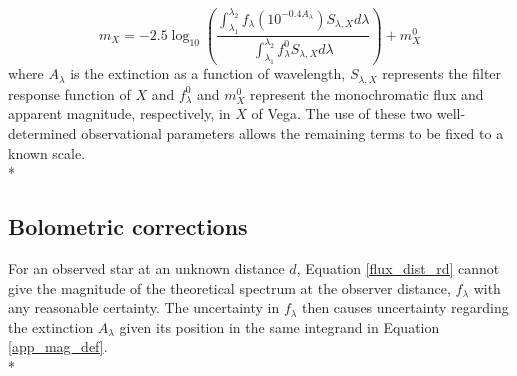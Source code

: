 \documentclass[12pt, a4paper]{report}
\begin{document}
\begin{equation}
m_{X} = -2.5 \log_{10} \left(\frac{ \int_{\lambda_{1}}^{\lambda_{2}} f_{\lambda} \left( 10^{-0.4 A_{\lambda}} \right) S_{\lambda,X} d\lambda }{ \int_{\lambda_{1}}^{\lambda_{2}} f_{\lambda}^{0} S_{\lambda,X} d\lambda }\right) + m_{X}^{0}
\label{app_mag_def}
\end{equation}
where $A_{\lambda}$ is the extinction as a function of wavelength, $S_{\lambda,X}$ represents the filter response function of $X$ and $f_{\lambda}^{0}$ and $m_{X}^{0}$ represent the monochromatic flux and apparent magnitude, respectively, in $X$ of Vega. The use of these two well-determined observational parameters allows the remaining terms to be fixed to a known scale.\\*

\subsection{Bolometric corrections}

For an observed star at an unknown distance $d$, Equation \ref{flux_dist_rd} cannot give the magnitude of the theoretical spectrum at the observer distance, $f_{\lambda}$ with any reasonable certainty. The uncertainty in $f_{\lambda}$ then causes uncertainty regarding the extinction $A_{\lambda}$ given its position in the same integrand in Equation \ref{app_mag_def}.\\*


\end{document}
